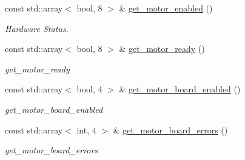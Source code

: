 \begin{DoxyCompactItemize}
const std\+::array$<$ bool, 8 $>$ \& \hyperlink{classblmc__robots_1_1Solo8_a9ebe42874824fddf80f726123740a08c}{get\+\_\+motor\+\_\+enabled} ()
\begin{DoxyCompactList}\small\item\em Hardware Status. \end{DoxyCompactList}\item 
const std\+::array$<$ bool, 8 $>$ \& \hyperlink{classblmc__robots_1_1Solo8_ad4b3e743c47212fea09388e544faa418}{get\+\_\+motor\+\_\+ready} ()
\begin{DoxyCompactList}\small\item\em get\+\_\+motor\+\_\+ready \end{DoxyCompactList}\item 
const std\+::array$<$ bool, 4 $>$ \& \hyperlink{classblmc__robots_1_1Solo8_a5ed9b4edda3e20305abce34bcb1b46f2}{get\+\_\+motor\+\_\+board\+\_\+enabled} ()
\begin{DoxyCompactList}\small\item\em get\+\_\+motor\+\_\+board\+\_\+enabled \end{DoxyCompactList}\item 
const std\+::array$<$ int, 4 $>$ \& \hyperlink{classblmc__robots_1_1Solo8_aad29e62a4dbbba13f0ea80dc7631f23c}{get\+\_\+motor\+\_\+board\+\_\+errors} ()
\begin{DoxyCompactList}\small\item\em get\+\_\+motor\+\_\+board\+\_\+errors \end{DoxyCompactList}\end{DoxyCompactItemize}
